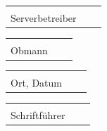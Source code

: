 \documentclass[parskip=half]{scrreprt}
\begin{document}
\vspace{0.5 cm}
\begin{tabular}{p{7cm}p{.5cm}l}
\dotfill \\
Serverbetreiber
\end{tabular}
\hfill
\begin{tabular}{p{7cm}p{.5cm}l}
\dotfill \\
Obmann
\end{tabular}

\vspace{0.5cm}
\begin{tabular}{p{7cm}p{.5cm}l}
\dotfill \\
Ort, Datum
\end{tabular}
\hfill
\begin{tabular}{p{7cm}p{.5cm}l}
\dotfill \\
Schriftführer
\end{tabular}


\end{document}
